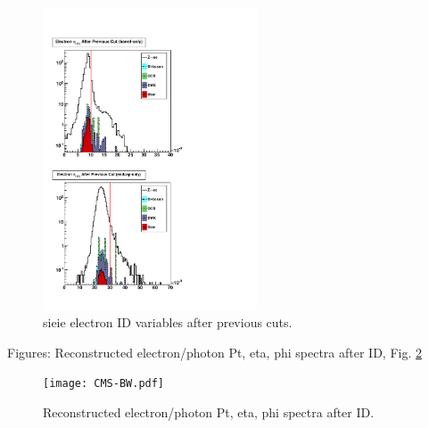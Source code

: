  \begin{figure}[htb]
  \begin{center}


    \includegraphics[width=180pt, angle=90]{Figures/sigIeIeSeq-01Apr11.pdf}
  \end{center}
  \caption[sieie electron ID variables after previous cuts]{sieie electron ID variables after previous cuts.}
  \label{fig:sieieElecIdVars}
 \end{figure}



Figures: Reconstructed electron/photon Pt, eta, phi spectra after ID, Fig. \ref{fig:RecoSpectraAfterEid}

 \begin{figure}[htb]
  \begin{center}
    \texttt{[image: CMS-BW.pdf]}
  \end{center}
  \caption[Reconstructed electron/photon Pt, eta, phi spectra after ID]{Reconstructed electron/photon Pt, eta, phi spectra after ID.}
  \label{fig:RecoSpectraAfterEid}
 \end{figure}


